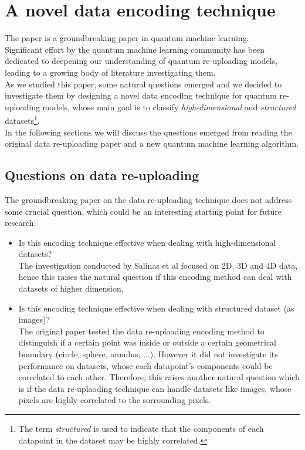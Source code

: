 
\chapter{A novel data encoding technique}

The paper \cite{Perez_reuploading} is a groundbreaking paper in quantum machine learning.\\
Significant effort by the quantum machine learning community has been dedicated to deepening our understanding of 
quantum re-uploading models, leading to a growing body of literature investigating them.\\
As we studied this paper, some natural questions emerged and we decided to investigate them by designing
a novel data encoding technique for quantum re-uploading models, whose main goal is to classify 
\textit{high-dimensional} and \textit{structured} datasets\footnote[1]{The term \textit{structured} is 
used to indicate that the components of each datapoint in the dataset may be highly correlated.}.\\
In the following sections we will discuss the questions emerged from reading the original data re-uploading
paper and a new quantum machine learning algorithm.

\section{Questions on data re-uploading}

The groundbreaking paper on the data re-uploading technique \cite{Perez_reuploading} does not address some crucial 
question, which could be an interesting starting point for future research:

\begin{itemize}
    \item\label{question:first} Is this encoding technique effective when dealing with high-dimensional datasets?\\
    The investigation conducted by Salinas et al focused on 2D, 3D and 4D data, hence this raises the natural
    question if this encoding method can deal with datasets of higher dimension.
    \item\label{question:second} Is this encoding technique effective when dealing with structured dataset (as images)?\\
    The original paper tested the data re-uploading encoding method to distinguish if a certain point was 
    inside or outside a certain geometrical boundary (circle, sphere, annulus, ...).
    However it did not investigate its performance on datasets, whose each datapoint's components could 
    be correlated to each other.
    Therefore, this raises another natural question which is if the data re-uplaoding technique can handle datasets
    like images, whose pixels are highly correlated to the sorrounding pixels.
\end{itemize}

